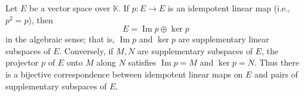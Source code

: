 Let $E$ be a vector space over $\mathbb{K}$. If $p \colon E \to E$ is an idempotent linear map (i.e., $p^2 = p$), then
$$E = \operatorname{Im} p \oplus \ker p$$
in the algebraic sense; that is, $\operatorname{Im} p$ and $\ker p$ are supplementary linear subspaces of $E$. Conversely, if $M, N$ are supplementary subspaces of $E$, the projector $p$ of $E$ onto $M$ along $N$ satisfies $\operatorname{Im} p = M$ and $\ker p = N$. Thus there is a bijective correspondence between idempotent linear maps on $E$ and pairs of supplementary subspaces of $E$.
